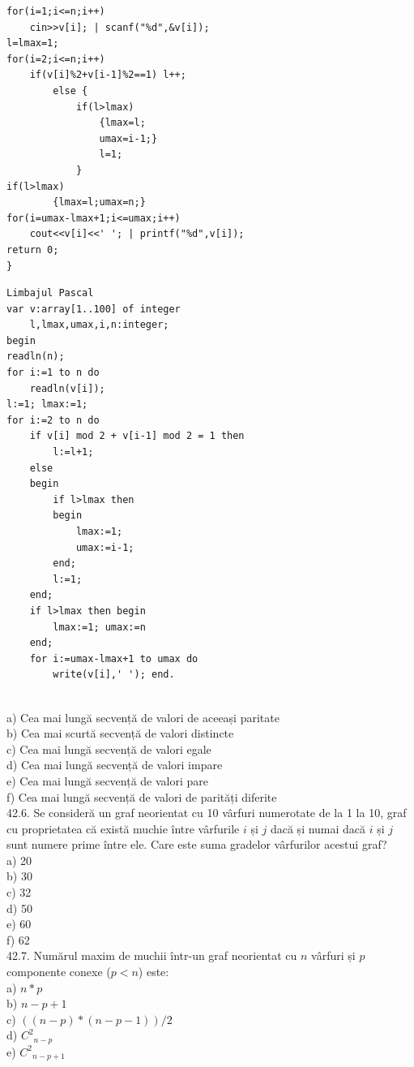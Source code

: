 \begin{itemize}
\begin{enumerate}
\begin{verbatim}
for(i=1;i<=n;i++)
    cin>>v[i]; | scanf("%d",&v[i]);
l=lmax=1;
for(i=2;i<=n;i++)
    if(v[i]%2+v[i-1]%2==1) l++;
        else {
            if(l>lmax)
                {lmax=l;
                umax=i-1;}
                l=1;
            }
if(l>lmax)
        {lmax=l;umax=n;}
for(i=umax-lmax+1;i<=umax;i++)
    cout<<v[i]<<' '; | printf("%d",v[i]);
return 0;
}
\end{verbatim}
\begin{verbatim}
Limbajul Pascal
var v:array[1..100] of integer
    l,lmax,umax,i,n:integer;
begin
readln(n);
for i:=1 to n do
    readln(v[i]);
l:=1; lmax:=1;
for i:=2 to n do
    if v[i] mod 2 + v[i-1] mod 2 = 1 then
        l:=l+1;
    else
    begin
        if l>lmax then
        begin
            lmax:=1;
            umax:=i-1;
        end;
        l:=1;
    end;
    if l>lmax then begin
        lmax:=1; umax:=n
    end;
    for i:=umax-lmax+1 to umax do 
        write(v[i],' '); end.
\end{verbatim}
\\
a) Cea mai lungă secvență de valori de aceeași paritate
\\
b) Cea mai scurtă secvență de valori distincte
\\
c) Cea mai lungă secvență de valori egale
\\
d) Cea mai lungă secvență de valori impare
\\
e) Cea mai lungă secvență de valori pare
\\
f) Cea mai lungă secvență de valori de parități diferite
\\
42.6. Se consideră un graf neorientat cu 10 vârfuri numerotate de la 1 la 10, graf cu proprietatea că există muchie între vârfurile $i$ și $j$ dacă și numai dacă $i$ și $j$ sunt numere prime între ele. Care este suma gradelor vârfurilor acestui graf?
\\
a) 20
\\
b) 30
\\
c) 32
\\
d) 50
\\
e) 60
\\
f) 62
\\
42.7. Numărul maxim de muchii într-un graf neorientat cu $n$ vârfuri și $p$ componente conexe ($p<n$) este:
\\
a) $n*p$
\\
b) $n-p+1$
\\
c) $((n-p)*(n-p-1))/2$
\\
d) $C^{2}{ }_{n-p}$
\\
e) $C^{2}{ }_{n-p+1}$
\\

\end{enumerate}
\end{itemize}
